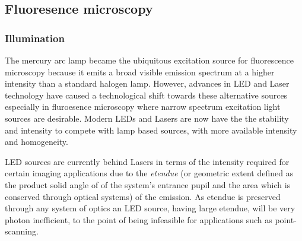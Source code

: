 \subsection{Fluoresence microscopy}

\subsubsection{Illumination}

The mercury arc lamp became the ubiquitous excitation source for fluorescence microscopy because it emits a broad visible emission spectrum at a higher intensity than a standard halogen lamp.
However, advances in \gls{LED} and \gls{Laser} technology have caused a technological shift towards these alternative sources especially in fluroesence microscopy where narrow spectrum excitation light sources are desirable.
Modern \gls{LED}s and \gls{Laser}s are now have the the stability and intensity to compete with lamp based sources, with more available intensity and homogeneity.

\gls{LED} sources are currently behind Lasers in terms of the intensity required for certain imaging applications due to the \emph{\gls{etendue}} (or geometric extent defined as the product solid angle of of the system's entrance pupil and the area which is conserved through optical systems) of the emission.
As \gls{etendue} is preserved through any system of optics an \gls{LED} source, having large \gls{etendue}, will be very photon inefficient, to the point of being infeasible for applications such as point-scanning.

